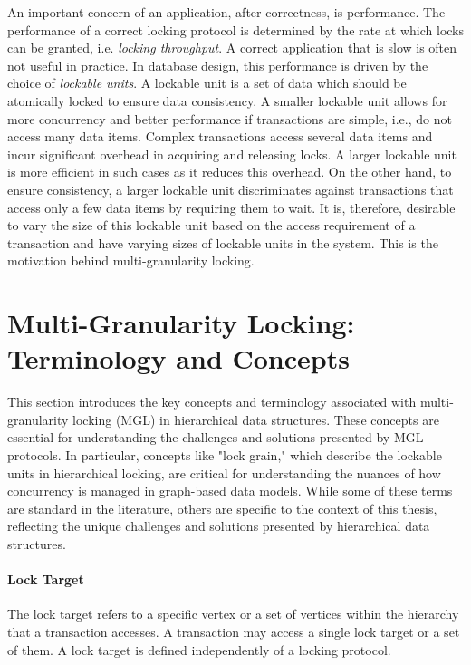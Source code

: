 An important concern of an application, after correctness, is performance. The performance of a correct locking protocol is determined by the rate at which locks can be granted, i.e. \emph{locking throughput}. A correct application that is slow is often not useful in practice. In database design, this performance is driven by the choice of \emph{lockable units}. A lockable unit is a set of data which should be atomically locked to ensure data consistency. A smaller lockable unit allows for more concurrency and better performance if transactions are simple, i.e., do not access many data items. Complex transactions access several data items and incur significant overhead in acquiring and releasing locks. A larger lockable unit is more efficient in such cases as it reduces this overhead.
On the other hand, to ensure consistency, a larger lockable unit discriminates against transactions that access only a few data items by requiring them to wait. It is, therefore, desirable to vary the size of this lockable unit based on the access requirement of a transaction and have varying sizes of lockable units in the system. This is the motivation behind multi-granularity locking. 

\section{Multi-Granularity Locking: Terminology and Concepts}
This section introduces the key concepts and terminology associated with multi-granularity locking (MGL) in hierarchical data structures. These concepts are essential for understanding the challenges and solutions presented by MGL protocols.
In particular, concepts like "lock grain," which describe the lockable units in hierarchical locking, are critical for understanding the nuances of how concurrency is managed in graph-based data models. While some of these terms are standard in the literature, others are specific to the context of this thesis, reflecting the unique challenges and solutions presented by hierarchical data structures.


\paragraph{Lock Target} The lock target refers to a specific vertex or a set of vertices within the hierarchy that a transaction accesses. A transaction may access a single lock target or a set of them. A lock target is defined independently of a locking protocol.  

